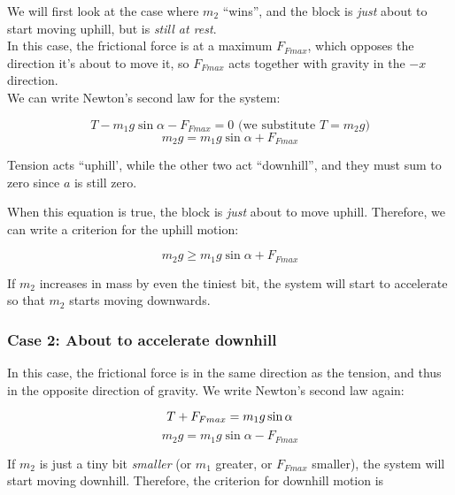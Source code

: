 We will first look at the case where $m_2$ ``wins'', and the block is \emph{just} about to start moving uphill, but is \emph{still at rest}.\\
In this case, the frictional force is at a maximum $F_{Fmax}$, which opposes the direction it's about to move it, so $F_{Fmax}$ acts together with gravity in the $-x$ direction.\\
We can write Newton's second law for the system:

\begin{equation}
T - m_1 g \sin \alpha - F_{Fmax} = 0\text{ (we substitute $T = m_2  g$)}
\end{equation}
\begin{equation}
m_2 g = m_1 g \sin \alpha + F_{Fmax}
\end{equation}

Tension acts ``uphill', while the other two act ``downhill'', and they must sum to zero since $a$ is still zero.

When this equation is true, the block is \emph{just} about to move uphill. Therefore, we can write a criterion for the uphill motion:

\begin{equation}
m_2 g \ge m_1 g \sin \alpha + F_{Fmax}
\end{equation}

If $m_2$ increases in mass by even the tiniest bit, the system will start to accelerate so that $m_2$ starts moving downwards.

\subsubsection{Case 2: About to accelerate downhill}

In this case, the frictional force is in the same direction as the tension, and thus in the opposite direction of gravity. We write Newton's second law again:

\begin{equation}
T + F_{Fmax} = m_1 g \sin \alpha\\
\end{equation}
\begin{equation}
m_2 g = m_1 g \sin \alpha - F_{Fmax}
\end{equation}

If $m_2$ is just a tiny bit \emph{smaller} (or $m_1$ greater, or $F_{Fmax}$ smaller), the system will start moving downhill. Therefore, the criterion for downhill motion is

